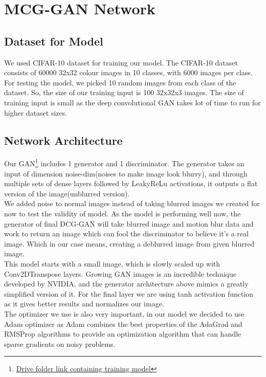 \documentclass[10pt,twocolumn,letterpaper]{article}
\begin{document}
\section{MCG-GAN Network}

\subsection{Dataset for Model}
We used CIFAR-10 dataset for training our model. The CIFAR-10 dataset consists of 60000 32x32 colour images in 10 classes, with 6000 images per class. For testing the model, we picked 10 random images from each class of the dataset. So, the size of our training input is 100 32x32x3 images. The size of training input is small as the deep convolutional GAN takes lot of time to run for higher dataset sizes.

\subsection{Network Architecture}
Our GAN\footnote[1]{\href{https://drive.google.com/drive/folders/1XLaAKyKIWfiOekj9VXCfOz7ow2UZIJ4v?usp=sharing}{Drive folder link containing training model}} includes 1 generator and 1 discriminator. The generator takes an input of dimension noise-dim(noises to make image look blurry), and through multiple sets of dense layers followed by LeakyReLu activations, it outputs a flat version of the image(unblurred version). 
\\
We added noise to normal images instead of taking blurred images we created for now to test the validity of model. As the model is performing well now, the generator of final DCG-GAN will take blurred image and motion blur data and work to return an image which can fool the discriminator to believe it’s a real image. Which in our case means, creating a deblurred image from given blurred image. 
\\
This model starts with a small image, which is slowly scaled up with Conv2DTranspose layers. Growing GAN images is an incredible technique developed by NVIDIA, and the generator architecture above mimics a greatly simplified version of it. For the final layer we are using tanh activation function as it gives better results and normalizes our image.
\\
The optimizer we use is also very important, in our model we decided to use Adam optimizer as Adam combines the best properties of the AdaGrad and RMSProp algorithms to provide an optimization algorithm that can handle sparse gradients on noisy problems.
\end{document}
